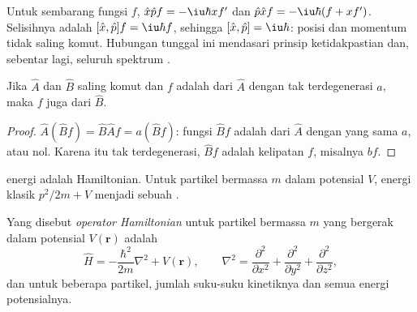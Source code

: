 \begin{example}\label{ex:b3:quantum-model-systems:canonical}
Untuk sembarang fungsi $f$, $\hat x\hat pf = -\iu\hbar xf'$ dan $\hat p\hat xf =
-\iu\hbar(f + xf')$. Selisihnya adalah $[\hat x,\hat p]f = \iu\hbar f$, sehingga
$[\hat x,\hat p] = \iu\hbar$: posisi dan momentum tidak saling komut. Hubungan
tunggal ini mendasari prinsip ketidakpastian dan, sebentar lagi, seluruh
spektrum .
\end{example}

\begin{proposition}\label{prop:b3:quantum-model-systems:commuting}
Jika $\hat A$ dan $\hat B$ saling komut dan $f$ adalah  dari
$\hat A$ dengan  tak terdegenerasi $a$, maka $f$ juga 
dari $\hat B$.
\end{proposition}

\begin{proof}
$\hat A(\hat Bf) = \hat B\hat Af = a(\hat Bf)$: fungsi $\hat Bf$ adalah  dari $\hat A$ dengan  yang sama $a$, atau nol. Karena  itu tak terdegenerasi, $\hat Bf$ adalah kelipatan $f$, misalnya $bf$.
\end{proof}

 energi adalah Hamiltonian. Untuk partikel bermassa $m$ dalam
potensial $V$, energi klasik $p^2/2m + V$ menjadi sebuah .

\begin{definition}\label{def:b3:quantum-model-systems:schrodinger}
Yang disebut \emph{operator Hamiltonian} untuk
partikel bermassa $m$ yang bergerak dalam potensial $V(\mathbf r)$ adalah
\[
\hat H = -\frac{\hbar^2}{2m}\nabla^2 + V(\mathbf r), \qquad \nabla^2 =
\frac{\partial^2}{\partial x^2} + \frac{\partial^2}{\partial y^2} +
\frac{\partial^2}{\partial z^2},
\]
dan untuk beberapa partikel, jumlah suku-suku kinetiknya dan semua energi
potensialnya.
\end{definition}

